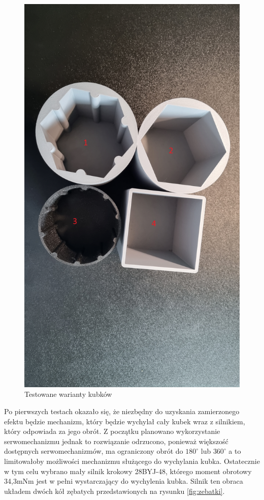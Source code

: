\begin{figure}[H]
    \centering
    \includegraphics[width=0.65\linewidth, trim={35mm 380mm 20mm 240mm}, clip]{chapters/03-praca-wlasna/figures/kubki.jpg}
    \caption{\label{fig:kubki}Testowane warianty kubków}
\end{figure}

Po pierwszych testach okazało się, że niezbędny do uzyskania zamierzonego efektu będzie mechanizm, który będzie 
wychylał cały kubek wraz z silnikiem, który odpowiada za jego obrót. Z początku planowano wykorzystanie
serwomechanizmu jednak to rozwiązanie odrzucono, ponieważ większość dostępnych serwomechanizmów, ma
ograniczony obrót do $180^{\circ}$ lub $360^{\circ}$ a to limitowałoby możliwości mechanizmu służącego do wychylania kubka.
Ostatecznie w tym celu wybrano mały silnik krokowy 28BYJ-48, którego moment obrotowy 34,3mNm jest w pełni wystarczający do wychylenia kubka. 
Silnik ten obraca układem dwóch kół zębatych przedstawionych na rysunku \ref{fig:zebatki}.


